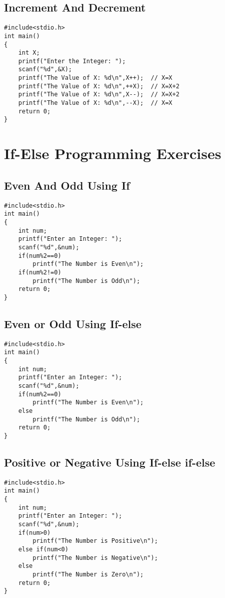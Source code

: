\documentclass[a4paper,14pt]{article}
\begin{document}
\subsection{Increment And Decrement}
\vspace{0.5cm}
\begin{lstlisting}[caption={Increment And Decrement}]
#include<stdio.h>
int main()
{
    int X;
    printf("Enter the Integer: ");
    scanf("%d",&X);
    printf("The Value of X: %d\n",X++);  // X=X
    printf("The Value of X: %d\n",++X);  // X=X+2
    printf("The Value of X: %d\n",X--);  // X=X+2
    printf("The Value of X: %d\n",--X);  // X=X
    return 0;
}
\end{lstlisting}
\newpage


\section{If-Else Programming Exercises}


\subsection{Even And Odd Using If}
\vspace{0.5cm}
\begin{lstlisting}[caption={Even And Odd Using If}]
#include<stdio.h>
int main()
{
    int num;
    printf("Enter an Integer: ");
    scanf("%d",&num);
    if(num%2==0)
        printf("The Number is Even\n");
    if(num%2!=0)
        printf("The Number is Odd\n");
    return 0;
}
\end{lstlisting}
\newpage

\subsection{Even or Odd Using If-else}
\vspace{0.5cm}
\begin{lstlisting}[caption={Even or Odd Using If-else}]
#include<stdio.h>
int main()
{
    int num;
    printf("Enter an Integer: ");
    scanf("%d",&num);
    if(num%2==0)
        printf("The Number is Even\n");
    else
        printf("The Number is Odd\n");
    return 0;
}
\end{lstlisting}
\newpage

\subsection{Positive or Negative Using If-else if-else}
\vspace{0.5cm}
\begin{lstlisting}[caption={Positive or Negative Using If-else if-else}]
#include<stdio.h>
int main()
{
    int num;
    printf("Enter an Integer: ");
    scanf("%d",&num);
    if(num>0)
        printf("The Number is Positive\n");
    else if(num<0)
        printf("The Number is Negative\n");
    else
        printf("The Number is Zero\n");
    return 0;
}
\end{lstlisting}
\newpage
\end{document}
